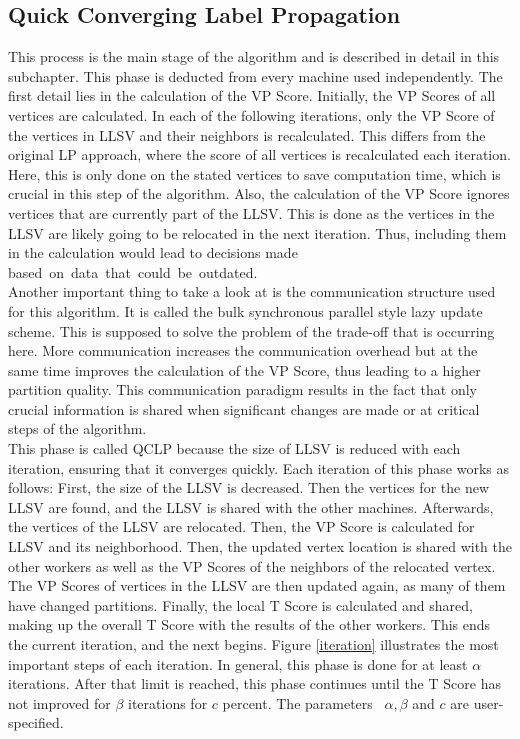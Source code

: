 \documentclass[acmsmall,nonacm,screen,review]{acmart}
\begin{document}
\subsection{Quick Converging Label Propagation}
This process is the main stage of the algorithm and is described in detail in this subchapter. This phase is deducted from every machine used independently. The first detail lies in the calculation of the VP Score. Initially, the VP Scores of all vertices are calculated. In each of the following iterations, only the VP Score of the vertices in LLSV and their neighbors is recalculated. This differs from the original LP approach, where the score of all vertices is recalculated each iteration. Here, this is only done on the stated vertices to save computation time, which is crucial in this step of the algorithm. Also, the calculation of the VP Score ignores vertices that are currently part of the LLSV. This is done as the vertices in the LLSV are likely going to be relocated in the next iteration. Thus, including them in the calculation would lead to decisions made \hbox{based on data that could be outdated.} 
\\
Another important thing to take a look at is the communication structure used for this algorithm. It is called the bulk synchronous parallel style \cite{BSP} lazy update scheme. This is supposed to solve the problem of the trade-off that is occurring here. More communication increases the communication overhead but at the same time improves the calculation of the VP Score, thus leading to a higher partition quality. This communication paradigm  results in the fact that only crucial information is shared when significant changes are made or at critical steps of the algorithm. \\
This phase is called QCLP because the size of LLSV is reduced with each iteration, ensuring that it converges quickly. Each iteration of this phase works as follows: First, the size of the LLSV is decreased. Then the vertices for the new LLSV are found, and the LLSV is shared with the other machines. Afterwards, the vertices of the LLSV are relocated. Then, the VP Score is calculated for LLSV and its neighborhood. Then, the updated vertex location is shared with the other workers as well as the VP Scores of the neighbors of the relocated vertex. The VP Scores of vertices in the LLSV are then updated again, as many of them have changed partitions. Finally, the local T Score is calculated and shared, making up the overall T Score with the results of the other workers. This ends the current iteration, and the next begins. Figure \ref{iteration} illustrates the most important steps of each iteration. In general, this phase is done for at least $\alpha$ iterations. After that limit is reached, this phase continues until the T Score has not improved for $\beta$ iterations for $c$ percent. The parameters ~$\alpha,\beta$ and $c$ are user-specified. \\
\end{document}
